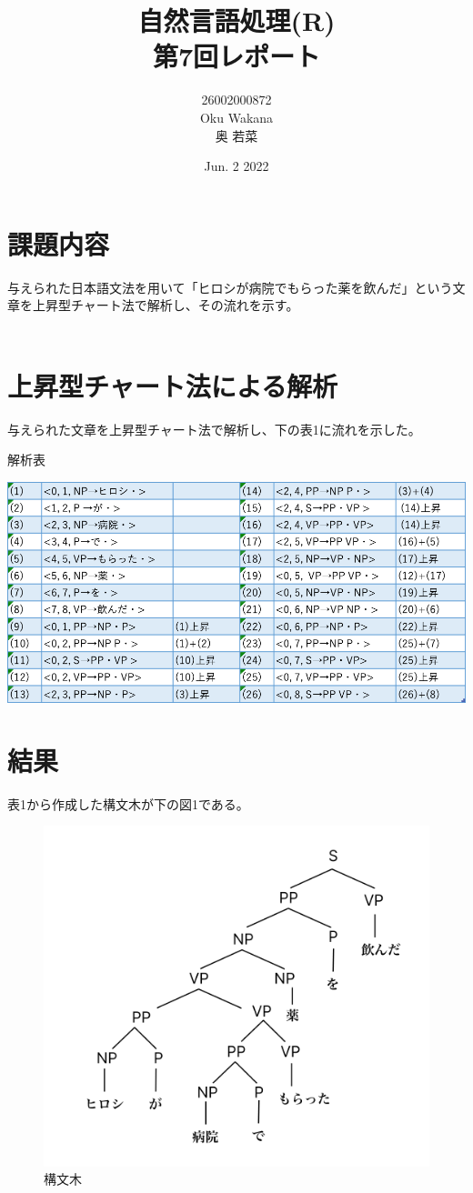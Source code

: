 \documentclass[dvipdfmx,autodetect-engine,titlepage]{jsarticle}
\title{自然言語処理(R)\\
第7回レポート\\
}
\author{26002000872\\Oku Wakana\\奥 若菜}
\date{Jun. 2 2022}
\begin{document}
\maketitle

\section{課題内容}
与えられた日本語文法を用いて「ヒロシが病院でもらった薬を飲んだ」という文章を上昇型チャート法で解析し、その流れを示す。\\\\

\section{上昇型チャート法による解析}
与えられた文章を上昇型チャート法で解析し、下の表1に流れを示した。\\

 \begin{table}[H]
    \centering
    \caption{解析表}\label{fig:表}
    \includegraphics[scale=0.3]{fg1.png}
\end{table}

\section{結果}
表1から作成した構文木が下の図1である。\\

 \begin{figure}[H]
    \centering
    \includegraphics[scale=0.17]{tree1.png}
    \caption{構文木}\label{fig:図}
\end{figure}
\end{document}
